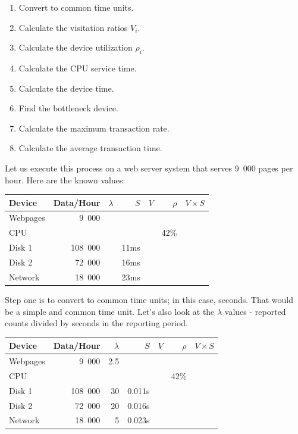 \documentclass[a4paper]{report}
\begin{document}
\begin{enumerate}[noitemsep]
	\item Convert to common time units.
	\item Calculate the visitation ratios $V_{i}$.
	\item Calculate the device utilization $\rho_{i}$.
	\item Calculate the CPU service time.
	\item Calculate the device time.
	\item Find the bottleneck device.
	\item Calculate the maximum transaction rate.
	\item Calculate the average transaction time.
\end{enumerate}

Let us execute this process on a web server system that serves 9~000 pages per hour. Here are the known values:

\begin{center}
\begin{tabular}{l|r|r|r|r|r|r} 
	\textbf{Device} & \textbf{Data/Hour} & \textbf{$\lambda$} & \textbf{$S$} & \textbf{$V$} & \textbf{$\rho$} & \textbf{$V \times S$} \\ \hline
	Webpages & 9~000 & & & & & \\ \hline
	CPU & & & & &  42\% & \\ \hline
	Disk 1 & 108~000 & & 11ms & & &\\ \hline
	Disk 2 & 72~000 & & 16ms & & &\\ \hline
	Network & 18~000 & & 23ms & & &
\end{tabular}
\end{center}

Step one is to convert to common time units; in this case, seconds. That would be a simple and common time unit. Let's also look at the $\lambda$ values - reported counts divided by seconds in the reporting period.

\begin{center}
\begin{tabular}{l|r|r|r|r|r|r} 
	\textbf{Device} & \textbf{Data/Hour} & \textbf{$\lambda$} & \textbf{$S$} & \textbf{$V$} & \textbf{$\rho$} & \textbf{$V \times S$} \\ \hline
	Webpages & 9~000 & 2.5 & & & & \\ \hline
	CPU & & & & & 42\% & \\ \hline
	Disk 1 & 108~000 & 30 & 0.011s  & & &\\ \hline
	Disk 2 & 72~000 & 20 & 0.016s & & &\\ \hline
	Network & 18~000 & 5 & 0.023s & & &
\end{tabular}
\end{center}
\end{document}
